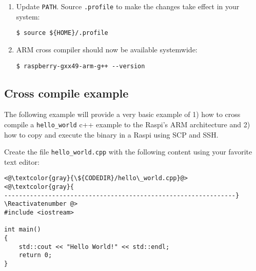 \begin{enumerate}
\item Update \texttt{PATH}. Source \texttt{.profile} to make the changes
take effect in your system:
\begin{lstlisting}[]
$ source ${HOME}/.profile
\end{lstlisting}
\FloatBarrier
\vspace{-5mm}

\item ARM cross compiler should now be available systemwide:

\begin{lstlisting}[]
$ raspberry-gxx49-arm-g++ --version
\end{lstlisting}
\FloatBarrier
\vspace{-5mm}

%

\end{enumerate}

\subsection{Cross compile example}

The following example will provide a very basic example of 1) how to cross compile
a \texttt{hello\_world} c++ example to the \ac{Raspi}'s ARM architecture
and 2) how to copy and execute the binary in a \ac{Raspi} using \ac{SCP} and
\ac{SSH}.


Create the file \texttt{hello\_world.cpp} with the following content using your
favorite text editor:

\Suppressnumber\begin{lstlisting}[]
<@\textcolor{gray}{\${CODEDIR}/hello\_world.cpp}@>
<@\textcolor{gray}{
---------------------------------------------------------------}
\Reactivatenumber @>
#include <iostream>

int main()
{
    std::cout << "Hello World!" << std::endl;
    return 0;
}
\end{lstlisting}
\FloatBarrier

